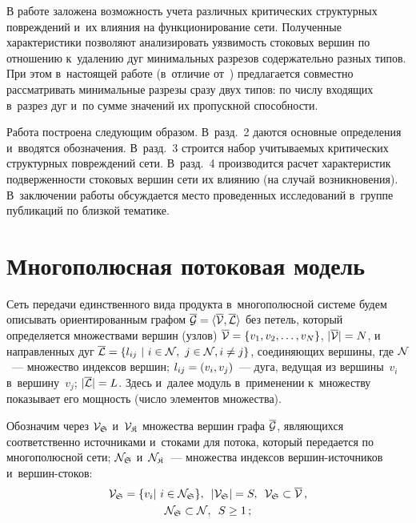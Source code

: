 \begin{multicols}{2}
В работе заложена возможность учета различных критических структурных повреждений и~их влияния на функционирование сети. Полученные характеристики позволяют    
анализировать  уязвимость  стоковых  вершин по отношению  к~удалению      
дуг   минимальных    разрезов содержательно разных  типов.  При этом в~настоящей 
работе (в~отличие от~\cite{Mal186}) предлагается совместно рассматривать 
минимальные разрезы сразу двух типов: по числу входящих в~разрез дуг и~по сумме 
значений их пропускной способности.

Работа построена следующим образом. В~разд.~2 даются основные определения и~вводятся 
обозначения. В~разд.~3 строится набор учи\-ты\-ва\-емых критических структурных повреждений 
сети. В~разд.~4 производится расчет характеристик подвер\-жен\-ности стоковых вершин  
сети их влиянию (на случай возникновения). 
В~заключении работы обсуждается место проведенных исследований в~группе 
пуб\-ли\-ка\-ций по близкой тематике. 

\section{Многополюсная потоковая модель}

Сеть передачи единственного вида продукта в~многополюсной системе 
будем описывать ориентированным графом $\overline {\cal G} \hm= 
\langle \overline{\cal V}, \overline{\cal L} \rangle$ без петель, 
который определяется множествами вершин (узлов) 
$\overline{\cal V} \hm= \left\{v_1,v_2,\ldots,v_ N\right\}$,  
$|\overline{\cal V}| \hm= N$,
и направленных дуг
$\overline {\cal L} \hm=\{l_{ij} \ | \ i \hm\in {\cal N}, \ j \hm\in {\cal N}, 
i \not = j \}$,
соединяющих вершины, где ${\cal N}$~--- множество индексов вершин;
$l_{ij} \hm= (v_i, v_j)$~---  дуга, ведущая из вершины~$v_i$ в~вершину~$v_j$; 
$|\overline{\cal L}| \hm= L$. Здесь и~далее модуль в~применении 
к~множеству показывает его мощ\-ность (чис\-ло элементов множества).

Обозначим через ${\cal V}_{\frak S}$ и~${\cal V}_{\frak K}$  
множества вершин графа $\overline {\cal G}$, 
являющихся соответственно источниками и~стоками для потока, 
который передается по многополюсной сети;
${\cal N}_{\frak S}$ и~${\cal N}_{\frak K}$~---  множества индексов вер\-шин-ис\-точ\-ни\-ков 
и~вер\-шин-сто\-ков:
\begin{multline*}
{\cal V}_{\frak S} = \{v_i | \ i \in {\cal N}_{\frak S} \},\enskip  
|{\cal V}_{\frak S}| = S,\enskip {\cal V}_{\frak S} \subset \overline{{\cal V}}\,,\\  
{\cal N}_{\frak S} \subset {\cal N},\enskip S \geq 1\,;
\end{multline*}


\end{multicols}
